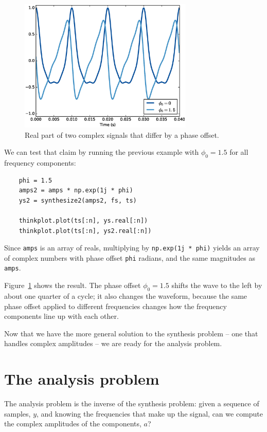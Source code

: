 \documentclass[12pt]{book}
\begin{document}
\begin{figure}
\centerline{\includegraphics[height=2.5in]{figs/dft2.eps}}
\caption{Real part of two complex signals that differ by a phase
offset.}
\label{fig.dft2}
\end{figure}

We can test that claim by running the previous example with
$\phi_0 = 1.5$ for all frequency components:

\begin{verbatim}
    phi = 1.5
    amps2 = amps * np.exp(1j * phi)
    ys2 = synthesize2(amps2, fs, ts)

    thinkplot.plot(ts[:n], ys.real[:n])
    thinkplot.plot(ts[:n], ys2.real[:n])
\end{verbatim}

Since {\tt amps}
is an array of reals, multiplying by {\tt np.exp(1j * phi)} yields
an array of complex numbers with phase offset {\tt phi} radians, and
the same magnitudes as {\tt amps}.

Figure~\ref{fig.dft2} shows the result.  The phase offset
$\phi_0 = 1.5$ shifts the wave to the left by about one quarter of
a cycle; it also changes the waveform, because the same phase
offset applied to different frequencies changes how the frequency
components line up with each other.

Now that we have the more general solution to the synthesis problem --
one that handles complex amplitudes -- we are ready for the analysis
problem.


\section{The analysis problem}

The analysis problem is the inverse of the synthesis problem: given a
sequence of samples, $y$, and knowing the frequencies
that make up the signal, can we compute the complex amplitudes of the
components, $a$?
\end{document}
